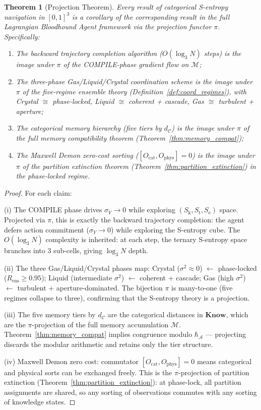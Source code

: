 \documentclass[twocolumn,11pt,a4paper]{article}
\theoremstyle{plain}
\newtheorem{theorem}{Theorem}[section]
\theoremstyle{definition}
\theoremstyle{remark}
\newcommand{\Sk}{S_{\mathrm{k}}}
\newcommand{\St}{S_{\mathrm{t}}}
\newcommand{\Se}{S_{\mathrm{e}}}
\newcommand{\Mspace}{\mathcal{M}}
\begin{document}
\begin{theorem}[Projection Theorem]
\label{thm:projection}
Every result of categorical S-entropy navigation in $[0,1]^3$ is a corollary of the corresponding result in the full Lagrangian Bloodhound Agent framework via the projection functor $\pi$.  Specifically:
\begin{enumerate}[label=(\roman*)]
  \item The backward trajectory completion algorithm ($O(\log_3 N)$ steps) is the image under $\pi$ of the COMPILE-phase gradient flow on $\Mspace$;
  \item The three-phase Gas/Liquid/Crystal coordination scheme is the image under $\pi$ of the five-regime ensemble theory (Definition~\ref{def:coord_regimes}), with Crystal $\cong$ phase-locked, Liquid $\cong$ coherent + cascade, Gas $\cong$ turbulent + aperture;
  \item The categorical memory hierarchy (five tiers by $d_\mathcal{C}$) is the image under $\pi$ of the full memory compatibility theorem (Theorem~\ref{thm:memory_compat});
  \item The Maxwell Demon zero-cost sorting ($[O_\mathrm{cat}, O_\mathrm{phys}] = 0$) is the image under $\pi$ of the partition extinction theorem (Theorem~\ref{thm:partition_extinction}) in the phase-locked regime.
\end{enumerate}
\end{theorem}

\begin{proof}
For each claim:

(i) The COMPILE phase drives $\sigma_Y \to 0$ while exploring $(\Sk,\St,\Se)$ space.  Projected via $\pi$, this is exactly the backward trajectory completion: the agent defers action commitment ($\sigma_Y \to 0$) while exploring the S-entropy cube.  The $O(\log_3 N)$ complexity is inherited: at each step, the ternary S-entropy space branches into 3 sub-cells, giving $\log_3 N$ depth.

(ii) The three Gas/Liquid/Crystal phases map: Crystal ($\sigma^2 \approx 0$) $\leftarrow$ phase-locked ($R_\mathrm{ens} \ge 0.95$); Liquid (intermediate $\sigma^2$) $\leftarrow$ coherent + cascade; Gas (high $\sigma^2$) $\leftarrow$ turbulent + aperture-dominated.  The bijection $\pi$ is many-to-one (five regimes collapse to three), confirming that the S-entropy theory is a projection.

(iii) The five memory tiers by $d_\mathcal{C}$ are the categorical distances in $\mathbf{Know}$, which are the $\pi$-projection of the full memory accumulation $\mathcal{M}$.  Theorem~\ref{thm:memory_compat} implies congruence modulo $\hbar_{\mathcal{A}}$ — projecting discards the modular arithmetic and retains only the tier structure.

(iv) Maxwell Demon zero cost: commutator $[O_\mathrm{cat}, O_\mathrm{phys}] = 0$ means categorical and physical sorts can be exchanged freely.  This is the $\pi$-projection of partition extinction (Theorem~\ref{thm:partition_extinction}): at phase-lock, all partition assignments are shared, so any sorting of observations commutes with any sorting of knowledge states.
\end{proof}
\end{document}
